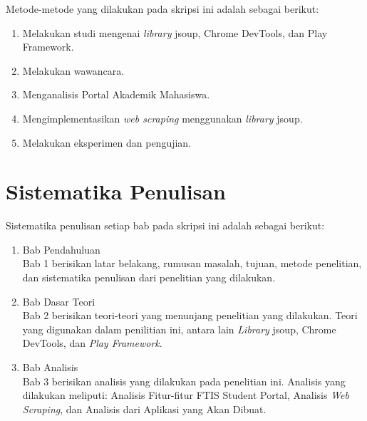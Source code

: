Metode-metode yang dilakukan pada skripsi ini adalah sebagai berikut:

\begin{enumerate}
	\item Melakukan studi mengenai \textit{library} jsoup, Chrome DevTools, dan Play Framework.
	\item Melakukan wawancara.
	\item Menganalisis Portal Akademik Mahasiswa.
	\item Mengimplementasikan \textit{web scraping} menggunakan \textit{library} jsoup.
	\item Melakukan eksperimen dan pengujian.
\end{enumerate}

\section{Sistematika Penulisan}
\label{sec:sistematika_penulisan}

Sistematika penulisan setiap bab pada skripsi ini adalah sebagai berikut:

\begin{enumerate}
  \item Bab Pendahuluan \\
  Bab 1 berisikan latar belakang, rumusan masalah, tujuan, metode penelitian,
  dan sistematika penulisan dari penelitian yang dilakukan.
  \item Bab Dasar Teori \\
  Bab 2 berisikan teori-teori yang menunjang penelitian yang dilakukan. Teori
  yang digunakan dalam penilitian ini, antara lain \textit{Library} jsoup, Chrome DevTools, dan \textit{Play Framework}.
  \item Bab Analisis \\
  Bab 3 berisikan analisis yang dilakukan pada penelitian ini. Analisis yang
  dilakukan meliputi: Analisis Fitur-fitur FTIS Student Portal, Analisis \textit{Web Scraping}, 
	dan Analisis dari Aplikasi yang Akan Dibuat.
\end{enumerate}
